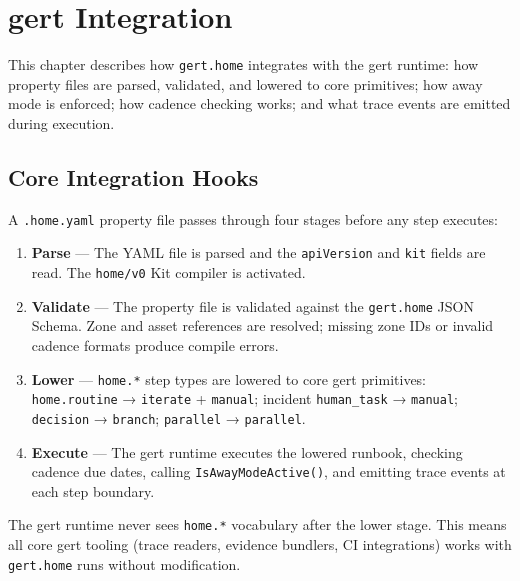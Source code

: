 \chapter{gert Integration}
\label{ch:gert-integration}

This chapter describes how \texttt{gert.home} integrates with the gert runtime: how
property files are parsed, validated, and lowered to core primitives; how away mode is
enforced; how cadence checking works; and what trace events are emitted during execution.

\section{Core Integration Hooks}
\label{sec:integration-hooks}

A \texttt{.home.yaml} property file passes through four stages before any step executes:

\begin{enumerate}
  \item \textbf{Parse} --- The YAML file is parsed and the \texttt{apiVersion} and
        \texttt{kit} fields are read. The \texttt{home/v0} Kit compiler is activated.
  \item \textbf{Validate} --- The property file is validated against the \texttt{gert.home}
        JSON Schema. Zone and asset references are resolved; missing zone IDs or invalid
        cadence formats produce compile errors.
  \item \textbf{Lower} --- \texttt{home.*} step types are lowered to core gert primitives:
        \texttt{home.routine} → \texttt{iterate} + \texttt{manual}; incident
        \texttt{human\_task} → \texttt{manual}; \texttt{decision} → \texttt{branch};
        \texttt{parallel} → \texttt{parallel}.
  \item \textbf{Execute} --- The gert runtime executes the lowered runbook, checking
        cadence due dates, calling \texttt{IsAwayModeActive()}, and emitting trace events at
        each step boundary.
\end{enumerate}

The gert runtime never sees \texttt{home.*} vocabulary after the lower stage. This means
all core gert tooling (trace readers, evidence bundlers, CI integrations) works with
\texttt{gert.home} runs without modification.

